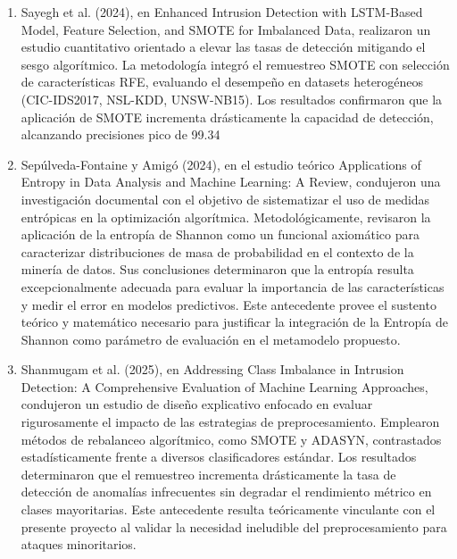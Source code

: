 \begin{enumerate}
\item Sayegh et al. (2024), en Enhanced Intrusion Detection with LSTM-Based Model, Feature Selection, and SMOTE for Imbalanced Data, realizaron un estudio cuantitativo orientado a elevar las tasas de detección mitigando el sesgo algorítmico. La metodología integró el remuestreo SMOTE con selección de características RFE, evaluando el desempeño en datasets heterogéneos (CIC-IDS2017, NSL-KDD, UNSW-NB15). Los resultados confirmaron que la aplicación de SMOTE incrementa drásticamente la capacidad de detección, alcanzando precisiones pico de 99.34%

\item Sepúlveda-Fontaine y Amigó (2024), en el estudio teórico Applications of Entropy in Data Analysis and Machine Learning: A Review, condujeron una investigación documental con el objetivo de sistematizar el uso de medidas entrópicas en la optimización algorítmica. Metodológicamente, revisaron la aplicación de la entropía de Shannon como un funcional axiomático para caracterizar distribuciones de masa de probabilidad en el contexto de la minería de datos. Sus conclusiones determinaron que la entropía resulta excepcionalmente adecuada para evaluar la importancia de las características y medir el error en modelos predictivos. Este antecedente provee el sustento teórico y matemático necesario para justificar la integración de la Entropía de Shannon como parámetro de evaluación en el metamodelo propuesto.

\item Shanmugam et al. (2025), en Addressing Class Imbalance in Intrusion Detection: A Comprehensive Evaluation of Machine Learning Approaches, condujeron un estudio de diseño explicativo enfocado en evaluar rigurosamente el impacto de las estrategias de preprocesamiento. Emplearon métodos de rebalanceo algorítmico, como SMOTE y ADASYN, contrastados estadísticamente frente a diversos clasificadores estándar. Los resultados determinaron que el remuestreo incrementa drásticamente la tasa de detección de anomalías infrecuentes sin degradar el rendimiento métrico en clases mayoritarias. Este antecedente resulta teóricamente vinculante con el presente proyecto al validar la necesidad ineludible del preprocesamiento para ataques minoritarios.


\end{enumerate}
